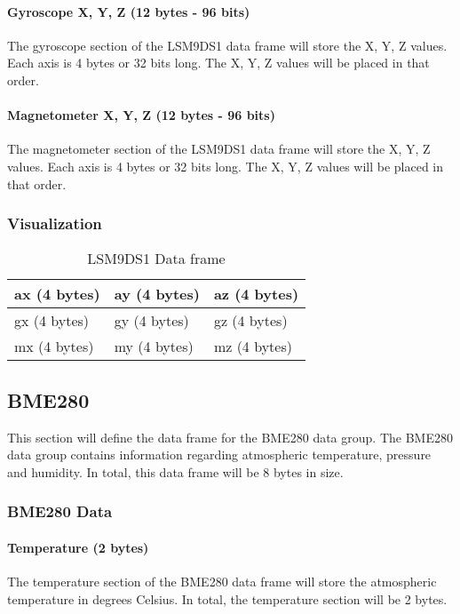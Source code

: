 \documentclass{article}
\begin{document}
  \paragraph{Gyroscope X, Y, Z (12 bytes - 96 bits)}
  The gyroscope section of the LSM9DS1 data frame will store the X, Y, Z values. Each axis is 4 bytes or 32 bits long. The X, Y, Z values will be placed in that order.
  \paragraph{Magnetometer X, Y, Z (12 bytes - 96 bits)}
  The magnetometer section of the LSM9DS1 data frame will store the X, Y, Z values. Each axis is 4 bytes or 32 bits long. The X, Y, Z values will be placed in that order.
  \subsubsection{Visualization}
  
  \begin{table}[h]
  \centering
  \caption{LSM9DS1 Data frame}
  \begin{tabular}{|l|l|l|l|l|l|l|l|l|l|l|l|}
  \hline
  \multicolumn{4}{|l|}{ax (4 bytes)} & \multicolumn{4}{l|}{ay (4 bytes)} & \multicolumn{4}{l|}{az (4 bytes)} \\ \hline
  \multicolumn{4}{|l|}{gx (4 bytes)} & \multicolumn{4}{l|}{gy (4 bytes)} & \multicolumn{4}{l|}{gz (4 bytes)} \\ \hline
  \multicolumn{4}{|l|}{mx (4 bytes)} & \multicolumn{4}{l|}{my (4 bytes)} & \multicolumn{4}{l|}{mz (4 bytes)} \\ \hline
  \end{tabular}
  \end{table}

  \pagebreak

  \subsection{BME280}
  This section will define the data frame for the BME280 data group. The BME280 data group contains information regarding atmospheric temperature, pressure and humidity. In total, this data frame will be 8 bytes in size.
  \subsubsection{BME280 Data}
  \paragraph{Temperature (2 bytes)}
  The temperature section of the BME280 data frame will store the atmospheric temperature in degrees Celsius. In total, the temperature section will be 2 bytes.
\end{document}
